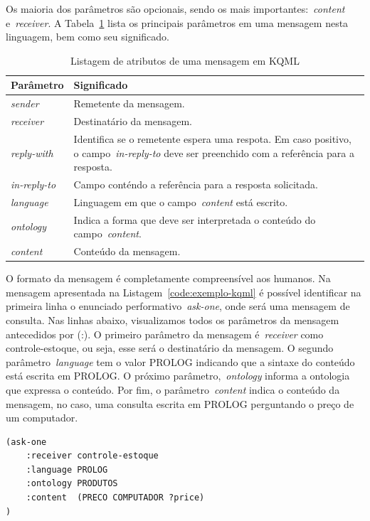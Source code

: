 Os maioria dos parâmetros são opcionais, sendo os mais importantes:~\emph{content} e~\emph{receiver}. A Tabela~\ref{parametros_kqml} lista os principais parâmetros em uma mensagem nesta linguagem, bem como seu significado.

\begin{table}
	\caption{Listagem de atributos de uma mensagem em KQML}
	\begin{tabular}{|p{3cm} | p{12cm} |}
		\hline
		\textbf{Parâmetro}	& \textbf{Significado}	\\
		\hline
		\emph{sender}		& Remetente da mensagem. \\
		\hline
		\emph{receiver}	& Destinatário da mensagem. \\
		\hline
		\emph{reply-with}	& Identifica se o remetente espera uma respota. Em caso positivo, o campo~\emph{in-reply-to} deve ser preenchido com a referência para a resposta. \\
		\hline
		\emph{in-reply-to}	& Campo conténdo a referência para a resposta solicitada. \\
		\hline
		\emph{language}	& Linguagem em que o campo~\emph{content} está escrito. \\ 
		\hline
		\emph{ontology}	& Indica a forma que deve ser interpretada o conteúdo do campo~\emph{content}. \\
		\hline
		\emph{content}		& Conteúdo da mensagem. \\
		\hline
	\end{tabular}
	\label{parametros_kqml}
\end{table}
O formato da mensagem é completamente compreensível aos humanos. Na mensagem apresentada na Listagem~\ref{code:exemplo-kqml} é possível identificar na primeira linha o enunciado performativo~\emph{ask-one}, onde será uma mensagem de consulta. Nas linhas abaixo, visualizamos todos os parâmetros da mensagem antecedidos por (:). O primeiro parâmetro da mensagem é~\emph{receiver} como controle-estoque, ou seja, esse será o destinatário da mensagem. O segundo parâmetro~\emph{language} tem o valor PROLOG indicando que a sintaxe do conteúdo está escrita em PROLOG. O próximo parâmetro,~\emph{ontology} informa a ontologia que expressa o conteúdo. Por fim, o parâmetro~\emph{content} indica o conteúdo da mensagem, no caso, uma consulta escrita em PROLOG perguntando o preço de um computador.

\begin{lstlisting}[label=code:exemplo-kqml,caption=Exemplo de mensagem em KQML]
(ask-one
	:receiver controle-estoque
	:language PROLOG
	:ontology PRODUTOS
	:content  (PRECO COMPUTADOR ?price)
)
\end{lstlisting}


